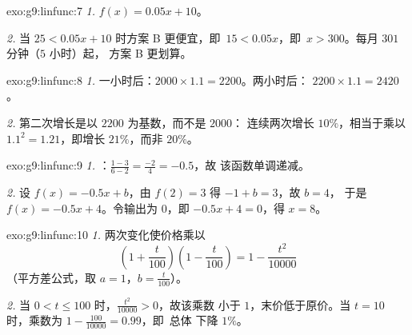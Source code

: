 \begin{solution}{exo:g9:linfunc:7}
\emph{1.} $f(x) = 0.05x + 10$。

\emph{2.} 当 $25 < 0.05x + 10$ 时方案 B 更便宜，即\
$15 < 0.05x$，即\ $x > 300$。每月 $301$ 分钟（$5$ 小时）起，
方案 B 更划算。
\end{solution}

\begin{solution}{exo:g9:linfunc:8}
\emph{1.} 一小时后：$2000 \times 1.1 = 2200$。两小时后：
$2200 \times 1.1 = 2420$。

\emph{2.} 第二次增长是以 $2200$ 为基数，而不是 $2000$：
连续两次增长 $10\%$，相当于乘以 $1.1^2 = 1.21$，即增长 $21\%$，而非
$20\%$。
\end{solution}

\begin{solution}{exo:g9:linfunc:9}
\emph{1.} ：$\frac{1 - 3}{6 - 2} = \frac{-2}{4} = -0.5$，故
该函数单调递减。

\emph{2.} 设 $f(x) = -0.5x + b$，由 $f(2) = 3$ 得 $-1 + b = 3$，故 $b = 4$，
于是 $f(x) = -0.5x + 4$。令输出为 $0$，即 $-0.5x + 4 = 0$，得 $x = 8$。
\end{solution}

\begin{solution}{exo:g9:linfunc:10}
\emph{1.} 两次变化使价格乘以
\[
\left(1 + \frac{t}{100}\right)\left(1 - \frac{t}{100}\right)
= 1 - \frac{t^2}{10000}
\]
（平方差公式，取 $a = 1$，$b = \frac{t}{100}$）。

\emph{2.} 当 $0 < t \leq 100$ 时，$\frac{t^2}{10000} > 0$，故该乘数
小于 $1$，末价低于原价。当
$t = 10$ 时，乘数为 $1 - \frac{100}{10000} = 0.99$，即\ 总体
下降 $1\%$。
\end{solution}

